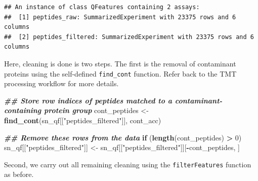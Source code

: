 \documentclass[9pt,a4paper,]{extarticle}
\newenvironment{Shaded}{\begin{snugshade}}{\end{snugshade}}
\newcommand{\ControlFlowTok}[1]{\textcolor[rgb]{0.13,0.29,0.53}{\textbf{#1}}}
\newcommand{\DecValTok}[1]{\textcolor[rgb]{0.00,0.00,0.81}{#1}}
\newcommand{\DocumentationTok}[1]{\textcolor[rgb]{0.56,0.35,0.01}{\textbf{\textit{#1}}}}
\newcommand{\FunctionTok}[1]{\textcolor[rgb]{0.13,0.29,0.53}{\textbf{#1}}}
\newcommand{\NormalTok}[1]{#1}
\newcommand{\OtherTok}[1]{\textcolor[rgb]{0.56,0.35,0.01}{#1}}
\newcommand{\SpecialCharTok}[1]{\textcolor[rgb]{0.81,0.36,0.00}{\textbf{#1}}}
\newcommand{\StringTok}[1]{\textcolor[rgb]{0.31,0.60,0.02}{#1}}
\begin{document}
\begin{verbatim}
## An instance of class QFeatures containing 2 assays:
##  [1] peptides_raw: SummarizedExperiment with 23375 rows and 6 columns 
##  [2] peptides_filtered: SummarizedExperiment with 23375 rows and 6 columns
\end{verbatim}

Here, cleaning is done is two steps. The first is the removal of contaminant
proteins using the self-defined \texttt{find\_cont} function. Refer back to the TMT
processing workflow for more details.

\begin{Shaded}
\begin{Highlighting}[]
\DocumentationTok{\#\# Store row indices of peptides matched to a contaminant{-}containing protein group}
\NormalTok{cont\_peptides }\OtherTok{\textless{}{-}} \FunctionTok{find\_cont}\NormalTok{(sn\_qf[[}\StringTok{"peptides\_filtered"}\NormalTok{]], cont\_acc)}

\DocumentationTok{\#\# Remove these rows from the data}
\ControlFlowTok{if}\NormalTok{ (}\FunctionTok{length}\NormalTok{(cont\_peptides) }\SpecialCharTok{\textgreater{}} \DecValTok{0}\NormalTok{)}
\NormalTok{  sn\_qf[[}\StringTok{"peptides\_filtered"}\NormalTok{]] }\OtherTok{\textless{}{-}}\NormalTok{ sn\_qf[[}\StringTok{"peptides\_filtered"}\NormalTok{]][}\SpecialCharTok{{-}}\NormalTok{cont\_peptides, ]}
\end{Highlighting}
\end{Shaded}

Second, we carry out all remaining cleaning using the \texttt{filterFeatures} function
as before.
\end{document}
